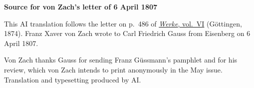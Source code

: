 \clearpage\thispagestyle{empty}
\begin{center}\textbf{Source for von Zach’s letter of 6 April 1807}\end{center}
\noindent This AI translation follows the letter on p.~486 of \href{https://gdz.sub.uni-goettingen.de/id/PPN236007467}{\textit{Werke}, vol.~VI} (Göttingen, 1874). Franz Xaver von Zach wrote to Carl Friedrich Gauss from Eisenberg on 6 April 1807.
\par\smallskip\noindent Von Zach thanks Gauss for sending Franz Güssmann’s pamphlet and for his review, which von Zach intends to print anonymously in the May issue. Translation and typesetting produced by AI.
\clearpage
